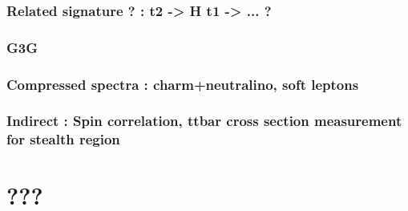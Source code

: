 
        \subsection{Related signature ? : t2 -> H t1 -> ... ?}
        \subsection{G3G}
        

        \subsection{Compressed spectra : charm+neutralino, soft leptons}



        \subsection{Indirect : Spin correlation, ttbar cross section measurement for stealth region}


\chapter{???}
        \loremipsum



        \loremipsum




